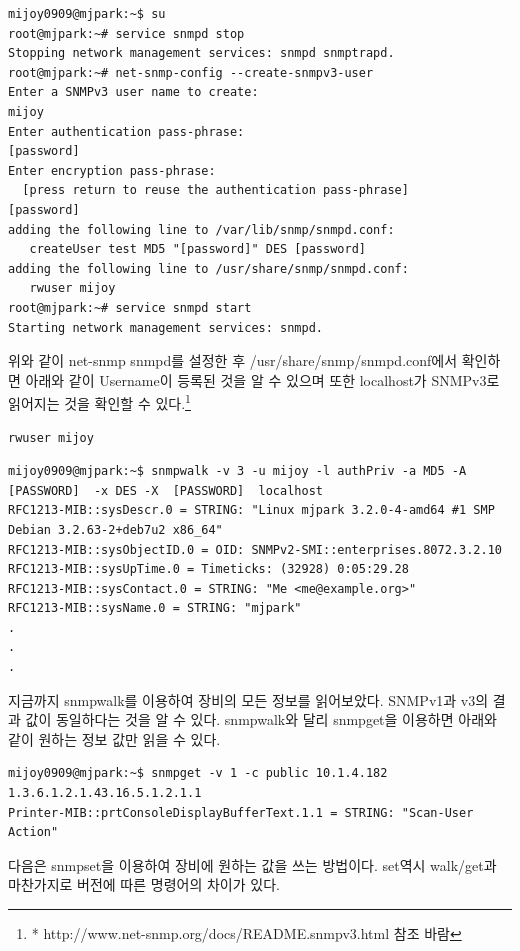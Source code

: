 \documentclass[11pt
  , a4paper
  , article
  , oneside
]{memoir}
\begin{document}
\begin{lstlisting}[style=termstyle]
mijoy0909@mjpark:~$ su                                     
root@mjpark:~# service snmpd stop
Stopping network management services: snmpd snmptrapd.
root@mjpark:~# net-snmp-config --create-snmpv3-user
Enter a SNMPv3 user name to create: 
mijoy
Enter authentication pass-phrase: 
[password]
Enter encryption pass-phrase: 
  [press return to reuse the authentication pass-phrase]
[password]
adding the following line to /var/lib/snmp/snmpd.conf:
   createUser test MD5 "[password]" DES [password]
adding the following line to /usr/share/snmp/snmpd.conf:
   rwuser mijoy
root@mjpark:~# service snmpd start
Starting network management services: snmpd.
\end{lstlisting}

위와 같이 net-snmp snmpd를 설정한 후 /usr/share/snmp/snmpd.conf에서 확인하면 아래와 같이 Username이 등록된 것을 알 수 있으며 또한 localhost가 SNMPv3로 읽어지는 것을 확인할 수 있다.\footnote{* http://www.net-snmp.org/docs/README.snmpv3.html 참조 바람}

\begin{lstlisting}[style=termstyle]
rwuser mijoy
\end{lstlisting}

\begin{lstlisting}[style=termstyle]
mijoy0909@mjpark:~$ snmpwalk -v 3 -u mijoy -l authPriv -a MD5 -A  [PASSWORD]  -x DES -X  [PASSWORD]  localhost
RFC1213-MIB::sysDescr.0 = STRING: "Linux mjpark 3.2.0-4-amd64 #1 SMP Debian 3.2.63-2+deb7u2 x86_64"
RFC1213-MIB::sysObjectID.0 = OID: SNMPv2-SMI::enterprises.8072.3.2.10
RFC1213-MIB::sysUpTime.0 = Timeticks: (32928) 0:05:29.28
RFC1213-MIB::sysContact.0 = STRING: "Me <me@example.org>"
RFC1213-MIB::sysName.0 = STRING: "mjpark"
.
.
.
\end{lstlisting}

지금까지 snmpwalk를 이용하여 장비의 모든 정보를 읽어보았다. SNMPv1과 v3의 결과 값이 동일하다는 것을 알 수 있다. snmpwalk와 달리 snmpget을 이용하면 아래와 같이 원하는 정보 값만 읽을 수 있다.
\begin{lstlisting}[style=termstyle]
mijoy0909@mjpark:~$ snmpget -v 1 -c public 10.1.4.182 1.3.6.1.2.1.43.16.5.1.2.1.1
Printer-MIB::prtConsoleDisplayBufferText.1.1 = STRING: "Scan-User Action"
\end{lstlisting}

다음은 snmpset을 이용하여 장비에 원하는 값을 쓰는 방법이다. set역시 walk/get과 마찬가지로 버전에 따른 명령어의 차이가 있다.
\end{document}
